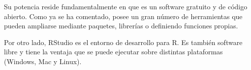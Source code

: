 Su potencia reside fundamentalmente en que es un software gratuito y de código abierto. Como ya se ha comentado, posee un gran número de herramientas que pueden ampliarse mediante paquetes, librerías o definiendo funciones propias.

Por otro lado, RStudio es el entorno de desarrollo para R. Es también software libre y tiene la ventaja que se puede ejecutar sobre distintas plataformas (Windows, Mac y Linux).



